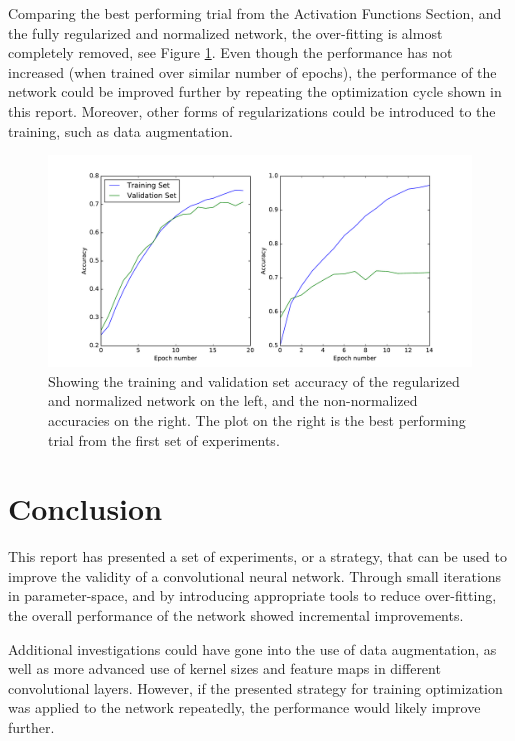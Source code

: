 \documentclass[]{article}
\begin{document}
Comparing the best performing trial from the Activation Functions Section, and the fully regularized and normalized network, the over-fitting is almost completely removed, see Figure \ref{before_after}. Even though the performance has not increased (when trained over similar number of epochs), the performance of the network could be improved further by repeating the optimization cycle shown in this report. Moreover, other forms of regularizations could be introduced to the training, such as data augmentation. 

\begin{figure}[h]
	\includegraphics[width=\textwidth]{before_after}
	\caption{Showing the training and validation set accuracy of the regularized and normalized network on the left, and the non-normalized accuracies on the right. The plot on the right is the best performing trial from the first set of experiments. } 
	\label{before_after}
	\centering
\end{figure}

\section{Conclusion}

This report has presented a set of experiments, or a strategy, that can be used to improve the validity of a convolutional neural network. Through small iterations in parameter-space, and by introducing appropriate tools to reduce over-fitting, the overall performance of the network showed incremental improvements. 

Additional investigations could have gone into the use of data augmentation, as well as more advanced use of kernel sizes and feature maps in different convolutional layers. However, if the presented strategy for training optimization was applied to the network repeatedly, the performance would likely improve further. 

\clearpage
\medskip


\end{document}
